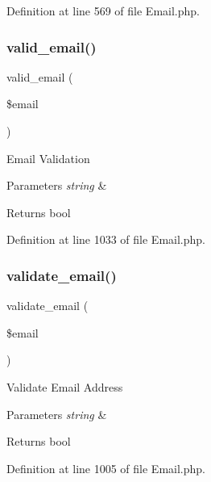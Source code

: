 Definition at line 569 of file Email.\+php.

\mbox{\label{class_c_i___email_abe07a23d74d453da8fb639b5c3951873}} 
\subsubsection{\texorpdfstring{valid\_email()}{valid\_email()}}
{\footnotesize\ttfamily valid\+\_\+email (\begin{DoxyParamCaption}\item[{}]{\$email }\end{DoxyParamCaption})}

Email Validation


\begin{DoxyParams}{Parameters}
{\em string} & \\
\hline
\end{DoxyParams}
\begin{DoxyReturn}{Returns}
bool 
\end{DoxyReturn}


Definition at line 1033 of file Email.\+php.

\mbox{\label{class_c_i___email_a1907f0dba44e2968b8260dbc5770550f}} 
\subsubsection{\texorpdfstring{validate\_email()}{validate\_email()}}
{\footnotesize\ttfamily validate\+\_\+email (\begin{DoxyParamCaption}\item[{}]{\$email }\end{DoxyParamCaption})}

Validate Email Address


\begin{DoxyParams}{Parameters}
{\em string} & \\
\hline
\end{DoxyParams}
\begin{DoxyReturn}{Returns}
bool 
\end{DoxyReturn}


Definition at line 1005 of file Email.\+php.

